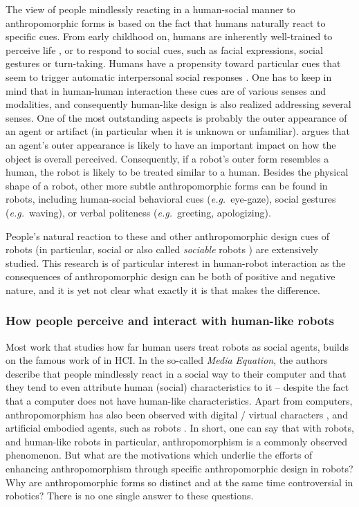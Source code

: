 \documentclass{frontiersSCNS} %
\newcommand{\eg}{{\textit{e.g.~}}}
\begin{document}
The view of people mindlessly reacting in a human-social manner to anthropomorphic forms
is based on the fact that humans naturally react to specific 
cues. From early childhood 
on, humans are inherently well-trained to perceive life \citep{epley_seeing_2007}, 
or to respond to social cues, such as facial expressions, social gestures or turn-taking. Humans have a propensity toward particular cues that seem to trigger automatic interpersonal social responses \citep{takayama_perspectives_2012}. 
One has to keep in mind that in 
human-human interaction these cues are of various senses and modalities, 
and consequently human-like design is also realized addressing several senses. 
One of the most outstanding aspects is probably the outer appearance of an agent or 
artifact (in particular when it is unknown or unfamiliar). \cite{schmitz_concepts_2011} 
argues that an agent's outer appearance is likely to have an important impact on how 
the object is overall perceived. Consequently, if a robot's outer form resembles a 
human, the robot is likely to be treated similar to a human. Besides the physical shape of a robot, other more subtle anthropomorphic forms can be found in robots, including human-social behavioral cues (\eg eye-gaze), social gestures (\eg waving), or verbal politeness (\eg greeting, apologizing).

People's natural reaction to these and other anthropomorphic design cues of
robots (in particular, social or also called \textit{sociable} robots 
\citep{breazeal_sociable_2000}) are extensively studied. This research is of particular interest in human-robot interaction as the consequences of anthropomorphic design can be both of positive and negative nature, and it is yet not clear what exactly it is that makes the difference.


\subsubsection{How people perceive and interact with human-like robots\\}
\label{sec:anthropomorphism-robotics}  
 
Most work that studies how far human users treat robots as social agents, builds on the 
famous work of \cite{reeves_media_1996} in HCI. In the so-called \textit{Media 
Equation}, the authors describe that people mindlessly react in a social way to their computer 
and that they tend to even attribute human (social) characteristics to it -- despite 
the fact that a computer does not have human-like characteristics. Apart from 
computers, anthropomorphism has also been observed with digital / virtual characters 
\citep{von_der_putten_it_2010}, and artificial embodied agents, 
such as robots \citep{rosenthal-vonderputten_experimental_2013}. 
In short, one can say that with robots, and human-like robots in 
particular, anthropomorphism is a commonly observed phenomenon. 
But what are the motivations which underlie the efforts of enhancing anthropomorphism 
through specific anthropomorphic design in robots? Why are anthropomorphic forms so 
distinct and at the same time controversial in robotics? There is no one single answer 
to these questions. 
 
\end{document}
